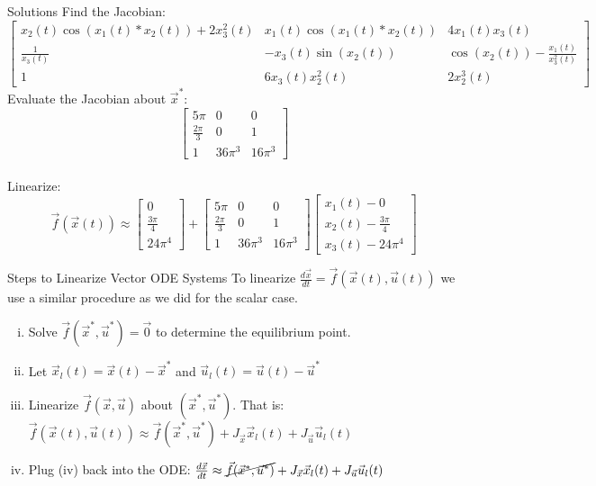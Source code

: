 \documentclass{beamer}
\begin{document}
\begin{frame}{Solutions}
Find the Jacobian: 
\small
\[
\begin{bmatrix}
x_2(t)\cos(x_1(t)*x_2(t)) + 2x_3^2(t)& x_1(t)\cos(x_1(t)*x_2(t)) & 4x_1(t)x_3(t)\\ 
\frac{1}{x_3(t)}& -x_3(t)\sin(x_2(t)) &\cos(x_2(t)) - \frac{x_1(t)}{x_3^2(t)}  \\ 
1 & 6x_3(t)x_2^2(t)& 2 x_2^3(t) 
\end{bmatrix}
\]
\normalsize
Evaluate the Jacobian about $\vec{x}^*$:
\[
\begin{bmatrix}
5 \pi & 0 & 0\\
\frac{2 \pi }{3}& 0 & 1\\
1 & 36 \pi^3 & 16 \pi^3
\end{bmatrix}
\]
\\
Linearize:
\begin{equation*}
\vec{f}(\vec{x}(t)) \approx 
\begin{bmatrix}
0 \\ \frac{3\pi }{4} \\ 24 \pi^4
\end{bmatrix} +
\begin{bmatrix}
5 \pi & 0 & 0\\
\frac{2 \pi }{3}& 0 & 1\\
1 & 36 \pi^3 & 16 \pi^3
\end{bmatrix}
\begin{bmatrix}
x_1(t) - 0 \\ x_2(t) - \frac{3\pi }{4} \\ x_3(t) - 24 \pi^4
\end{bmatrix}
\end{equation*}

\end{frame}

\begin{frame}{Steps to Linearize Vector ODE Systems}
To linearize $\frac{d\vec{x}}{dt} = \vec{f}(\vec{x}(t), \vec{u}(t))$ we use a similar procedure as we did for the scalar case. \pause 
\begin{enumerate}[(i)]
\item Solve $\vec{f}(\vec{x}^*, \vec{u}^*) = \vec{0}$ to determine the equilibrium point. \pause \\
\item Let $\vec{x}_l(t) = \vec{x}(t) - \vec{x}^*$ and $\vec{u}_l(t) = \vec{u}(t) - \vec{u}^*$ \pause \\
\item Linearize $\vec{f}(\vec{x}, \vec{u})$ about $(\vec{x}^*, \vec{u}^*)$. That is: $\vec{f}(\vec{x}(t), \vec{u}(t)) \approx \vec{f}(\vec{x}^*, \vec{u}^*) + J_{\vec{x}}\vec{x}_l(t) + J_{\vec{u}}\vec{u}_l(t)$ \pause \\
\item Plug (iv) back into the ODE: $\frac{d\vec{x}}{dt} \approx \cancel{\vec{f}(\vec{x}^*, \vec{u}^*)} + J_{\vec{x}}\vec{x}_l(t) + J_{\vec{u}}\vec{u}_l(t)$
\end{enumerate}

\end{frame}
\end{document}
